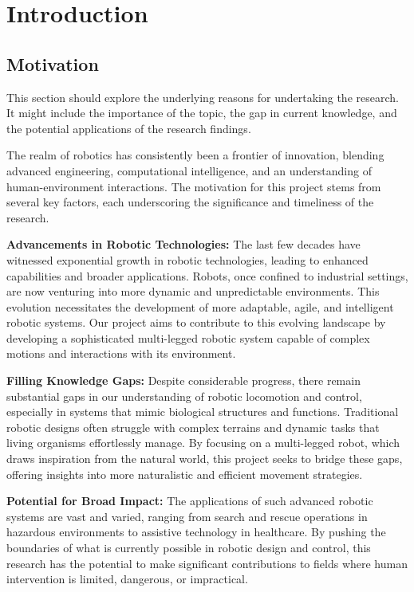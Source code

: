 \chapter{Introduction}

\graphicspath{{./Figures/Modeling}}



\section{Motivation}
This section should explore the underlying reasons for undertaking the research. It might include the importance of the topic, the gap in current knowledge, and the potential applications of the research findings.



The realm of robotics has consistently been a frontier of innovation, blending advanced engineering, computational intelligence, and an understanding of human-environment interactions. The motivation for this project stems from several key factors, each underscoring the significance and timeliness of the research.

\textbf{Advancements in Robotic Technologies:} The last few decades have witnessed exponential growth in robotic technologies, leading to enhanced capabilities and broader applications. Robots, once confined to industrial settings, are now venturing into more dynamic and unpredictable environments. This evolution necessitates the development of more adaptable, agile, and intelligent robotic systems. Our project aims to contribute to this evolving landscape by developing a sophisticated multi-legged robotic system capable of complex motions and interactions with its environment.

\textbf{Filling Knowledge Gaps:} Despite considerable progress, there remain substantial gaps in our understanding of robotic locomotion and control, especially in systems that mimic biological structures and functions. Traditional robotic designs often struggle with complex terrains and dynamic tasks that living organisms effortlessly manage. By focusing on a multi-legged robot, which draws inspiration from the natural world, this project seeks to bridge these gaps, offering insights into more naturalistic and efficient movement strategies.

\textbf{Potential for Broad Impact:} The applications of such advanced robotic systems are vast and varied, ranging from search and rescue operations in hazardous environments to assistive technology in healthcare. By pushing the boundaries of what is currently possible in robotic design and control, this research has the potential to make significant contributions to fields where human intervention is limited, dangerous, or impractical.

